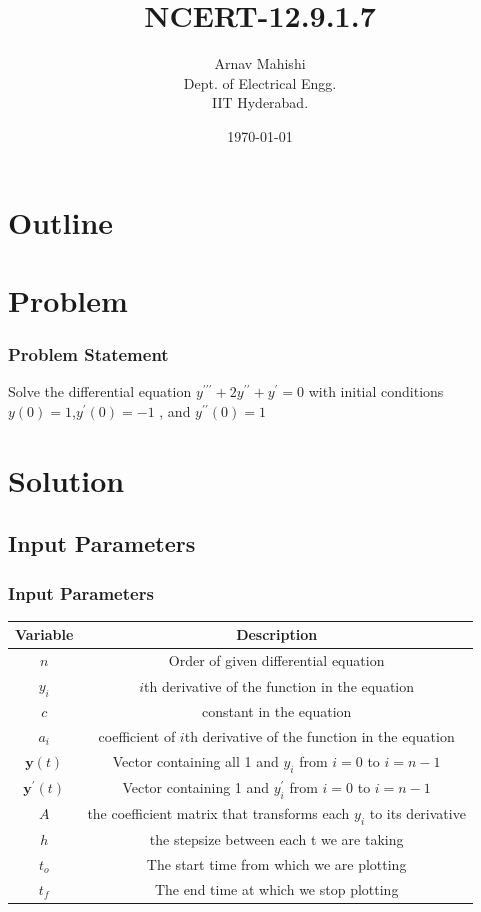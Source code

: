 \documentclass{beamer}
\title{NCERT-12.9.1.7}
\author{Arnav Mahishi \\ Dept. of Electrical Engg.\\IIT Hyderabad.}
\date{\today}
\providecommand{\brak}[1]{\ensuremath{\left(#1\right)}}
\theoremstyle{remark}
\let\vec\mathbf
\numberwithin{equation}{section}
\begin{document}
\begin{frame}
\titlepage
\end{frame}
\section*{Outline}
\begin{frame}
\tableofcontents
\end{frame}
\section{Problem}
\begin{frame}
\frametitle{Problem Statement}
Solve the differential equation $y^{\prime\prime\prime}+2y^{\prime\prime}+y^{\prime} = 0$ with initial conditions $y\brak{0} = 1$,$y^{\prime}\brak{0} = -1$ , and $y^{\prime\prime}\brak{0} = 1$
\end{frame}
\section{Solution}
\subsection{Input Parameters}
\begin{frame}
\frametitle{Input Parameters}
\begin{table}[]
    \centering
    \begin{tabular}[12pt]{ |c| c|}
    \hline
    \textbf{Variable} & \textbf{Description}\\ 
    \hline
    $n$ & Order of given differential equation\\
    \hline
    $y_i$ & $i$th derivative of the function in the equation\\
    \hline
    $c$ & constant in the equation\\
    \hline
    $a_i$&coefficient of $i$th derivative of the function in the equation\\
    \hline
    $\vec{y}\brak{t}$& Vector containing all 1 and $y_i$ from $i=0$ to $i=n-1$\\
    \hline
    $\vec{y}^{\prime}\brak{t}$ & Vector containing 1 and $y^{\prime}_i$ from $i=0$ to $i=n-1$\\
    \hline
    $A$& the coefficient matrix that transforms each $y_i$ to its derivative\\
    \hline
    $h$&the stepsize between each t we are taking\\
    \hline
    $t_o$& The start time from which we are plotting\\
    \hline
    $t_f$& The end time at which we stop plotting\\
    \hline
    \end{tabular}
    \label{tab:my_label}
\end{table}
\end{frame}
\end{document}

